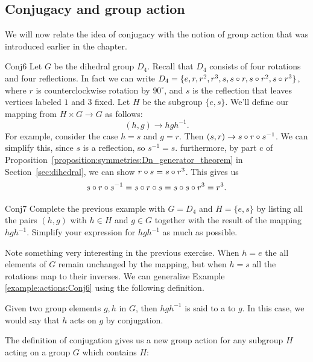 \subsection*{Conjugacy and group action}

We will now relate the idea of conjugacy with the notion of group action that was introduced earlier in the chapter.


\begin{example}{Conj6}
Let $G$ be the dihedral group $D_4$.  Recall that $D_4$ consists of four rotations and four reflections.  In fact we can write $D_4=\{e, r, r^2, r^3, s,s\circ r,s\circ r^2,s\circ r^3\}$, where $r$ is counterclockwise rotation by $90^{\circ}$, and $s$ is the reflection that leaves vertices labeled $1$ and $3$ fixed.  Let $H$ be the subgroup $\{e,s\}$.  
We'll define our mapping from $H\times G \rightarrow G$ as follows:
$$(h,g) \rightarrow hgh^{-1}. $$
For example, consider the case $h=s$ and $g=r$. Then $(s,r) \rightarrow s\circ r \circ s^{-1}$.  We can simplify this, since $s$ is a reflection, so $s^{-1}=s$.  furthermore, by part c of Proposition~\ref{proposition:symmetries:Dn_generator_theorem}  in Section~\ref{sec:dihedral}, we can show $r\circ s =s\circ r^3$.  This gives us
$$ s\circ r\circ s^{-1}=s\circ r\circ s=s\circ s\circ r^3=r^3.$$

\end {example}
\begin{exercise}{Conj7}
Complete the previous example with $G=D_4$ and $H=\{e,s\}$ by listing all the pairs $(h,g)$ with $h\in H$ and $g \in G$ together with the result of the mapping $hgh^{-1}$.  Simplify your expression for $hgh^{-1}$ as much as possible.
\end{exercise}
Note something very interesting in the previous exercise.  When $h=e$ the all elements of $G$ remain unchanged by the mapping, but when $h=s$ all the rotations map to their inverses.
 We can generalize Example \ref{example:actions:Conj6} using the following definition.

\begin{defn}
Given two group elements $g,h$ in $G$, then $hgh^{-1}$ is said to a  to $g$. In this case, we would say that $h$ acts on $g$ by conjugation.
\end{defn}
The definition of conjugation gives us a new group action for any subgroup $H$ acting on a group $G$ which contains $H$:

